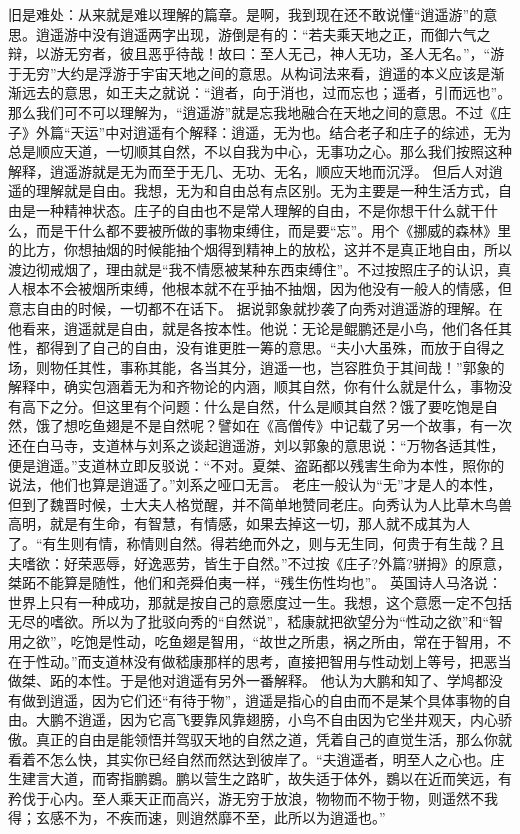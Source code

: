 \documentclass[]{book}
\begin{document}
旧是难处：从来就是难以理解的篇章。是啊，我到现在还不敢说懂``逍遥游''的意思。逍遥游中没有逍遥两字出现，游倒是有的：``若夫乘天地之正，而御六气之辩，以游无穷者，彼且恶乎待哉！故曰：至人无己，神人无功，圣人无名。''，``游于无穷''大约是浮游于宇宙天地之间的意思。从构词法来看，逍遥的本义应该是渐渐远去的意思，如王夫之就说：``逍者，向于消也，过而忘也；遥者，引而远也''。那么我们可不可以理解为，``逍遥游''就是忘我地融合在天地之间的意思。不过《庄子》外篇``天运''中对逍遥有个解释：逍遥，无为也。结合老子和庄子的综述，无为总是顺应天道，一切顺其自然，不以自我为中心，无事功之心。那么我们按照这种解释，逍遥游就是无为而至于无几、无功、无名，顺应天地而沉浮。
但后人对逍遥的理解就是自由。我想，无为和自由总有点区别。无为主要是一种生活方式，自由是一种精神状态。庄子的自由也不是常人理解的自由，不是你想干什么就干什么，而是干什么都不要被所做的事物束缚住，而是要``忘''。用个《挪威的森林》里的比方，你想抽烟的时候能抽个烟得到精神上的放松，这并不是真正地自由，所以渡边彻戒烟了，理由就是``我不情愿被某种东西束缚住''。不过按照庄子的认识，真人根本不会被烟所束缚，他根本就不在乎抽不抽烟，因为他没有一般人的情感，但意志自由的时候，一切都不在话下。
据说郭象就抄袭了向秀对逍遥游的理解。在他看来，逍遥就是自由，就是各按本性。他说：无论是鲲鹏还是小鸟，他们各任其性，都得到了自己的自由，没有谁更胜一筹的意思。``夫小大虽殊，而放于自得之场，则物任其性，事称其能，各当其分，逍遥一也，岂容胜负于其间哉！''郭象的解释中，确实包涵着无为和齐物论的内涵，顺其自然，你有什么就是什么，事物没有高下之分。但这里有个问题：什么是自然，什么是顺其自然？饿了要吃饱是自然，饿了想吃鱼翅是不是自然呢？譬如在《高僧传》中记载了另一个故事，有一次还在白马寺，支道林与刘系之谈起逍遥游，刘以郭象的意思说：``万物各适其性，便是逍遥。''支道林立即反驳说：``不对。夏桀、盗跖都以残害生命为本性，照你的说法，他们也算是逍遥了。''刘系之哑口无言。
老庄一般认为``无''才是人的本性，但到了魏晋时候，士大夫人格觉醒，并不简单地赞同老庄。向秀认为人比草木鸟兽高明，就是有生命，有智慧，有情感，如果去掉这一切，那人就不成其为人了。``有生则有情，称情则自然。得若绝而外之，则与无生同，何贵于有生哉？且夫嗜欲：好荣恶辱，好逸恶劳，皆生于自然。''不过按《庄子?外篇?骈拇》的原意，桀跖不能算是随性，他们和尧舜伯夷一样，``残生伤性均也''。
英国诗人马洛说：世界上只有一种成功，那就是按自己的意愿度过一生。我想，这个意愿一定不包括无尽的嗜欲。所以为了批驳向秀的``自然说''，嵇康就把欲望分为``性动之欲''和``智用之欲''，吃饱是性动，吃鱼翅是智用，``故世之所患，祸之所由，常在于智用，不在于性动。''而支道林没有做嵇康那样的思考，直接把智用与性动划上等号，把恶当做桀、跖的本性。于是他对逍遥有另外一番解释。
他认为大鹏和知了、学鸠都没有做到逍遥，因为它们还``有待于物''，逍遥是指心的自由而不是某个具体事物的自由。大鹏不逍遥，因为它高飞要靠风靠翅膀，小鸟不自由因为它坐井观天，内心骄傲。真正的自由是能领悟并驾驭天地的自然之道，凭着自己的直觉生活，那么你就看着不怎么快，其实你已经自然而然达到彼岸了。``夫逍遥者，明至人之心也。庄生建言大道，而寄指鹏鷃。鹏以营生之路旷，故失适于体外，鷃以在近而笑远，有矜伐于心内。至人乘天正而高兴，游无穷于放浪，物物而不物于物，则遥然不我得；玄感不为，不疾而速，则逍然靡不至，此所以为逍遥也。''
\end{document}
